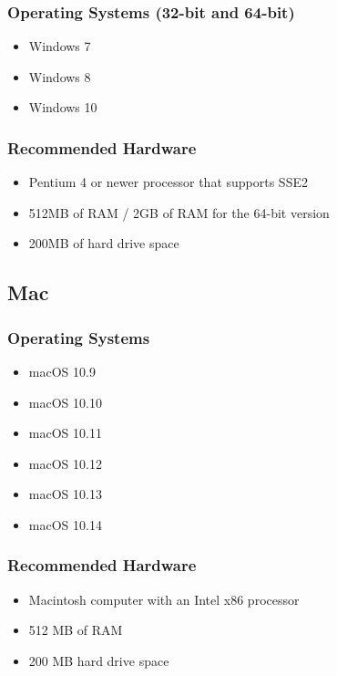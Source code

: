 \documentclass{article}
\begin{document}
\subsubsection*{Operating Systems (32-bit and
	64-bit)}\label{operating-systems-32-bit-and-64-bit}

\begin{itemize}
	\item Windows 7
	\item Windows 8
	\item Windows 10
\end{itemize}

\subsubsection*{Recommended Hardware}\label{recommended-hardware}

\begin{itemize}
	\item Pentium 4 or newer processor that supports SSE2
	\item 512MB of RAM / 2GB of RAM for the 64-bit version
	\item 200MB of hard drive space
\end{itemize}

\subsection*{Mac}\label{mac}

\subsubsection*{Operating Systems}\label{operating-systems}

\begin{itemize}
	\item macOS 10.9
	\item macOS 10.10
	\item macOS 10.11
	\item macOS 10.12
	\item macOS 10.13
	\item macOS 10.14
\end{itemize}

\subsubsection*{Recommended Hardware}\label{recommended-hardware_1}

\begin{itemize}
	\item Macintosh computer with an Intel x86 processor
	\item 512 MB of RAM
	\item 200 MB hard drive space
\end{itemize}
\end{document}
